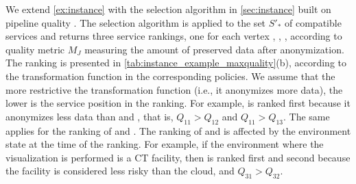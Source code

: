 \begin{example}
  We extend \cref{ex:instance} with the selection algorithm in \cref{sec:instance} built on pipeline quality \q. The selection algorithm is applied to the set $S'_*$ of compatible services and returns three service rankings, one for each vertex , , , according to quality metric $M_J$ measuring the amount of preserved data after anonymization. The ranking is presented in \cref{tab:instance_example_maxquality}(b), according to the transformation function in the corresponding policies.
  We assume that the more restrictive the transformation function (i.e., it anonymizes more data), the lower is the service position in the ranking.
  For example,  is ranked first because it anonymizes less data than  and , that is, $Q_{11}$$>$$Q_{12}$ and $Q_{11}$$>$$Q_{13}$.  The same applies for the ranking of  and .
  The ranking of  and  is affected by the environment state at the time of the ranking.   For example, if the environment where the visualization is performed is a CT facility, then  is ranked first and  second because the facility is considered less risky than the cloud, and $Q_{31}$$>$$Q_{32}$.
\end{example}


